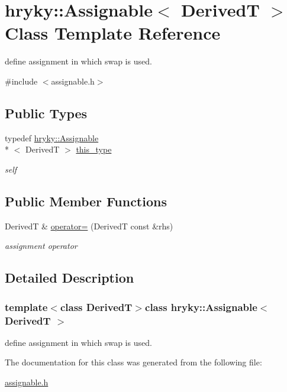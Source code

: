 \hypertarget{classhryky_1_1_assignable}{\section{hryky\-:\-:Assignable$<$ Derived\-T $>$ Class Template Reference}
\label{classhryky_1_1_assignable}
}


define assignment in which swap is used.  




{\ttfamily \#include $<$assignable.\-h$>$}

\subsection*{Public Types}
\begin{DoxyCompactItemize}
\item 
\hypertarget{classhryky_1_1_assignable_abcdf8a532564410425753acee1350979}{typedef \hyperlink{classhryky_1_1_assignable}{hryky\-::\-Assignable}\\*
$<$ Derived\-T $>$ \hyperlink{classhryky_1_1_assignable_abcdf8a532564410425753acee1350979}{this\-\_\-type}}\label{classhryky_1_1_assignable_abcdf8a532564410425753acee1350979}

\begin{DoxyCompactList}\small\item\em self \end{DoxyCompactList}\end{DoxyCompactItemize}
\subsection*{Public Member Functions}
\begin{DoxyCompactItemize}
\item 
\hypertarget{classhryky_1_1_assignable_a6393258b39e0f8ecbc7acd813d947a1f}{Derived\-T \& \hyperlink{classhryky_1_1_assignable_a6393258b39e0f8ecbc7acd813d947a1f}{operator=} (Derived\-T const \&rhs)}\label{classhryky_1_1_assignable_a6393258b39e0f8ecbc7acd813d947a1f}

\begin{DoxyCompactList}\small\item\em assignment operator \end{DoxyCompactList}\end{DoxyCompactItemize}


\subsection{Detailed Description}
\subsubsection*{template$<$class Derived\-T$>$class hryky\-::\-Assignable$<$ Derived\-T $>$}

define assignment in which swap is used. 

The documentation for this class was generated from the following file\-:\begin{DoxyCompactItemize}
\item 
\hyperlink{assignable_8h}{assignable.\-h}\end{DoxyCompactItemize}
